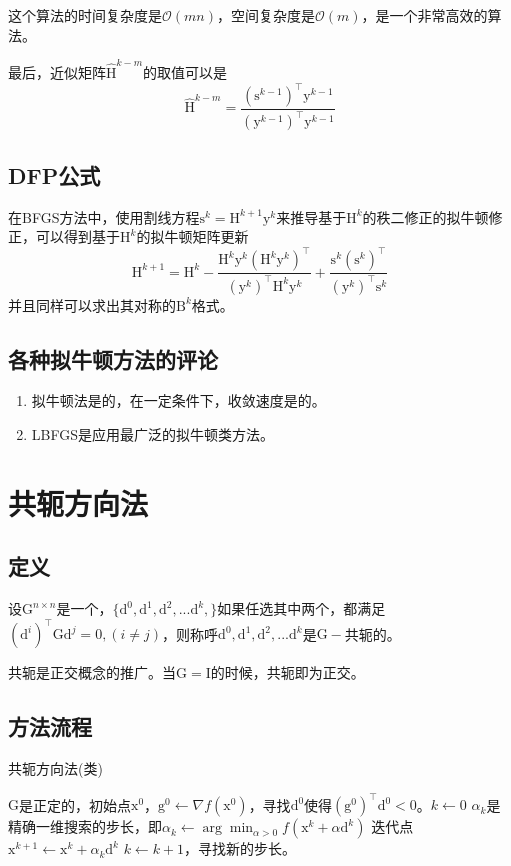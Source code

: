 \documentclass[a4paper]{D:/repositories/MyDGP/latex/PaperReadingLog}
\begin{document}
这个算法的时间复杂度是$\mathcal{O}(mn)$，空间复杂度是$\mathcal{O}(m)$，是一个非常高效的算法。

最后，近似矩阵$\hat{\mathrm{H}}^{k-m}$的取值可以是
$$
\hat{\mathrm{H}}^{k-m}=\frac{(\mathrm{s}^{k-1})^\top \mathrm{y}^{k-1}}{(\mathrm{y}^{k-1})^\top \mathrm{y}^{k-1}}
$$

\subsection{DFP公式}
在BFGS方法中，使用割线方程$\mathrm{s}^k=\mathrm{H}^{k+1}\mathrm{y}^k$来推导基于$\mathrm{H}^k$的秩二修正的拟牛顿修正，可以得到基于$\mathrm{H}^k$的拟牛顿矩阵更新
$$
\mathrm{H}^{k+1}=\mathrm{H}^k-\frac{\mathrm{H}^k\mathrm{y}^k(\mathrm{H}^k\mathrm{y}^k)^\top}{(\mathrm{y}^k)^\top \mathrm{H}^k\mathrm{y}^k}+\frac{\mathrm{s}^k(\mathrm{s}^k)^\top}{(\mathrm{y}^k)^\top \mathrm{s}^k}
$$
并且同样可以求出其对称的$\mathrm{B}^k$格式。

\subsection{各种拟牛顿方法的评论}
\begin{enumerate}
	\item 拟牛顿法是的，在一定条件下，收敛速度是的。
	\item LBFGS是应用最广泛的拟牛顿类方法。
\end{enumerate}

\section{共轭方向法}
\subsection{定义}
设$\mathrm{G}^{n\times n}$是一个，$\{\mathrm{d}^0,\mathrm{d}^1,\mathrm{d}^2,...\mathrm{d}^k,\}$如果任选其中两个，都满足$(\mathrm{d}^i)^\top \mathrm{G}\mathrm{d}^j=0,(i\neq j)$，则称呼$\mathrm{d}^0,\mathrm{d}^1,\mathrm{d}^2,...\mathrm{d}^k$是$\mathrm{G}-$共轭的。

共轭是正交概念的推广。当$\mathrm{G}=\mathrm{I}$的时候，共轭即为正交。

\subsection{方法流程}
\begin{algorithm}[H]
	\caption{共轭方向法(类)} 
	\begin{algorithmic}[1]
		\STATE $\mathrm{G}$是正定的，初始点$\mathrm{x}^0$，$\mathrm{g}^0\leftarrow\nabla f(\mathrm{x}^0)$，寻找$\mathrm{d}^0$使得$(\mathrm{g}^0)^\top\mathrm{d}^0<0$。$k\leftarrow 0$
		\STATE $\alpha_k$是精确一维搜索的步长，即$\alpha_k\leftarrow\arg\min_{\alpha>0}f(\mathrm{x}^k+\alpha\mathrm{d}^k)$
		\STATE 迭代点$\mathrm{x}^{k+1}\leftarrow\mathrm{x}^k+\alpha_k\mathrm{d}^k$
		\STATE {}
		\STATE $k\leftarrow k+1$，寻找新的步长。
	\end{algorithmic}
\end{algorithm}
\end{document}

